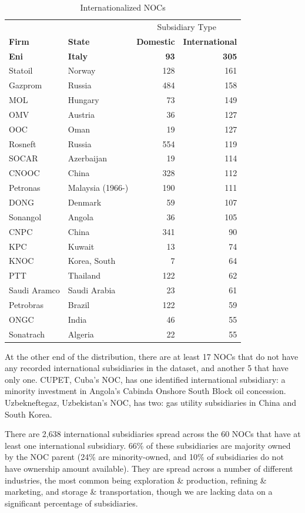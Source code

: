 \documentclass[11pt,]{book}
\begin{document}
\begin{table}

\caption{\label{tab:toptbl}Internationalized NOCs}
\centering
\begin{tabular}[t]{llrr}
\toprule
\multicolumn{2}{c}{ } & \multicolumn{2}{c}{Subsidiary Type} \\
\cmidrule(l{3pt}r{3pt}){3-4}
\textbf{Firm} & \textbf{State} & \textbf{Domestic} & \textbf{International}\\
\midrule
\textbf{Eni} & \textbf{Italy} & \textbf{93} & \textbf{305}\\
Statoil & Norway & 128 & 161\\
Gazprom & Russia & 484 & 158\\
MOL & Hungary & 73 & 149\\
OMV & Austria & 36 & 127\\
\addlinespace
OOC & Oman & 19 & 127\\
Rosneft & Russia & 554 & 119\\
SOCAR & Azerbaijan & 19 & 114\\
CNOOC & China & 328 & 112\\
Petronas & Malaysia (1966-) & 190 & 111\\
\addlinespace
DONG & Denmark & 59 & 107\\
Sonangol & Angola & 36 & 105\\
CNPC & China & 341 & 90\\
KPC & Kuwait & 13 & 74\\
KNOC & Korea, South & 7 & 64\\
\addlinespace
PTT & Thailand & 122 & 62\\
Saudi Aramco & Saudi Arabia & 23 & 61\\
Petrobras & Brazil & 122 & 59\\
ONGC & India & 46 & 55\\
Sonatrach & Algeria & 22 & 55\\
\bottomrule
\end{tabular}
\end{table}

At the other end of the distribution, there are at least 17 NOCs that do not have any recorded international subsidiaries in the dataset, and another 5 that have only one. CUPET, Cuba's NOC, has one identified international subsidiary: a minority investment in Angola's Cabinda Onshore South Block oil concession. Uzbekneftegaz, Uzbekistan's NOC, has two: gas utility subsidiaries in China and South Korea.

There are 2,638 international subsidiaries spread across the 60 NOCs that have at least one international subsidiary. 66\% of these subsidiaries are majority owned by the NOC parent (24\% are minority-owned, and 10\% of subsidiaries do not have ownership amount available). They are spread across a number of different industries, the most common being exploration \& production, refining \& marketing, and storage \& transportation, though we are lacking data on a significant percentage of subsidiaries.
\end{document}
